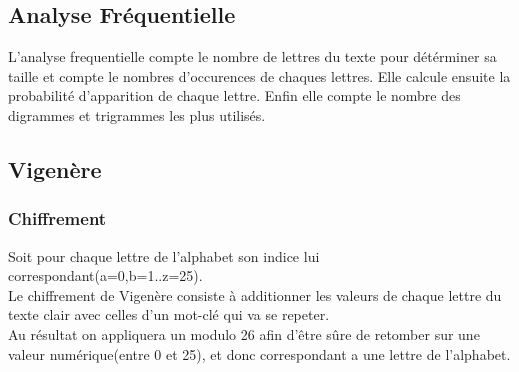 \documentclass[a4]{article}
\begin{document}
		\subsection{Analyse Fréquentielle}
			L'analyse frequentielle compte le nombre de lettres du texte pour détérminer
			sa taille et compte le nombres d'occurences de chaques lettres.
			Elle calcule ensuite la probabilité d'apparition de chaque lettre.
			Enfin elle compte le nombre des digrammes et trigrammes les plus utilisés.
		\subsection{Vigenère}			    
			\subsubsection{Chiffrement}
				Soit pour chaque lettre de l'alphabet son indice lui correspondant(a=0,b=1..z=25).\\
				Le chiffrement de Vigenère consiste à additionner les valeurs de chaque lettre du texte
				clair avec celles d'un mot-clé qui va se repeter.\\
				Au résultat on appliquera un modulo 26 afin d'être sûre de retomber sur une valeur 
				numérique(entre 0 et 25),
				 et donc correspondant a une lettre de l'alphabet.
\end{document}
